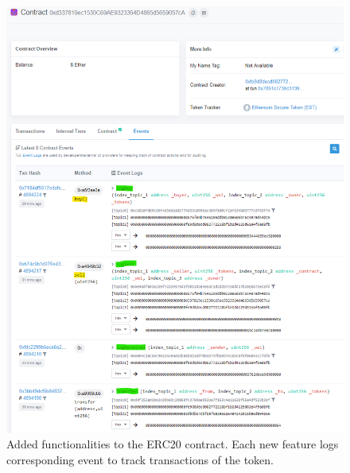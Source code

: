 \begin{figure}[t]
	\centering
	\includegraphics[width=1.0\linewidth]{figures/img20.png}
	\caption{Added functionalities to the ERC20 contract. Each new feature logs corresponding event to track transactions of the token.}
	\label{fig:propevents}
\end{figure}